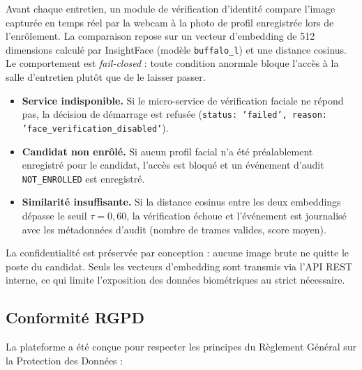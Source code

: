 Avant chaque entretien, un module de vérification d'identité compare l'image capturée en temps
réel par la webcam à la photo de profil enregistrée lors de l'enrôlement. La comparaison repose
sur un vecteur d'embedding de 512 dimensions calculé par InsightFace (modèle \texttt{buffalo\_l})
et une distance cosinus. Le comportement est \textit{fail-closed} : toute condition anormale
bloque l'accès à la salle d'entretien plutôt que de le laisser passer.

\begin{itemize}
  \item \textbf{Service indisponible.} Si le micro-service de vérification faciale ne répond
        pas, la décision de démarrage est refusée (\texttt{status: 'failed',
        reason: 'face\_verification\_disabled'}).
  \item \textbf{Candidat non enrôlé.} Si aucun profil facial n'a été préalablement enregistré
        pour le candidat, l'accès est bloqué et un événement d'audit
        \texttt{NOT\_ENROLLED} est enregistré.
  \item \textbf{Similarité insuffisante.} Si la distance cosinus entre les deux embeddings
        dépasse le seuil $\tau = 0{,}60$, la vérification échoue et l'événement est journalisé
        avec les métadonnées d'audit (nombre de trames valides, score moyen).
\end{itemize}

La confidentialité est préservée par conception : aucune image brute ne quitte le poste du
candidat. Seuls les vecteurs d'embedding sont transmis via l'API REST interne, ce qui limite
l'exposition des données biométriques au strict nécessaire.

\subsection{Conformité RGPD}

La plateforme a été conçue pour respecter les principes du Règlement Général sur la Protection
des Données :

